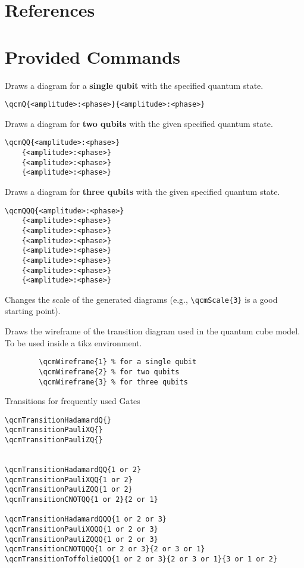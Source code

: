 \documentclass{article}
\begin{document}
\section*{References}


\section*{Provided Commands}

\begin{description}
    \item Draws a diagram for a \textbf{single qubit} with the specified quantum state.
    \begin{verbatim}
\qcmQ{<amplitude>:<phase>}{<amplitude>:<phase>}
    \end{verbatim}

    \item Draws a diagram for \textbf{two qubits} with the given specified quantum state.
    \begin{verbatim}
\qcmQQ{<amplitude>:<phase>}
    {<amplitude>:<phase>}
    {<amplitude>:<phase>}
    {<amplitude>:<phase>}
    \end{verbatim}

    \item  Draws a diagram for \textbf{three qubits} with the given specified quantum state.
    \begin{verbatim}
\qcmQQQ{<amplitude>:<phase>}
    {<amplitude>:<phase>}
    {<amplitude>:<phase>}
    {<amplitude>:<phase>}
    {<amplitude>:<phase>}
    {<amplitude>:<phase>}
    {<amplitude>:<phase>}
    {<amplitude>:<phase>}
    \end{verbatim}

  
    \item Changes the scale of the generated diagrams (e.g., \verb|\qcmScale{3}| is a good starting point).
  
    \item Draws the wireframe of the transition diagram used in the quantum cube model.
        To be used inside a tikz environment.
    \begin{verbatim}
        \qcmWireframe{1} % for a single qubit
        \qcmWireframe{2} % for two qubits
        \qcmWireframe{3} % for three qubits
    \end{verbatim}

    \item Transitions for frequently used Gates
    \begin{verbatim}
\qcmTransitionHadamardQ{}
\qcmTransitionPauliXQ{}
\qcmTransitionPauliZQ{}


\qcmTransitionHadamardQQ{1 or 2}
\qcmTransitionPauliXQQ{1 or 2}
\qcmTransitionPauliZQQ{1 or 2}
\qcmTransitionCNOTQQ{1 or 2}{2 or 1}

\qcmTransitionHadamardQQQ{1 or 2 or 3}
\qcmTransitionPauliXQQQ{1 or 2 or 3}
\qcmTransitionPauliZQQQ{1 or 2 or 3}
\qcmTransitionCNOTQQQ{1 or 2 or 3}{2 or 3 or 1}
\qcmTransitionToffolieQQQ{1 or 2 or 3}{2 or 3 or 1}{3 or 1 or 2}
    \end{verbatim}
\end{description}
\end{document}
